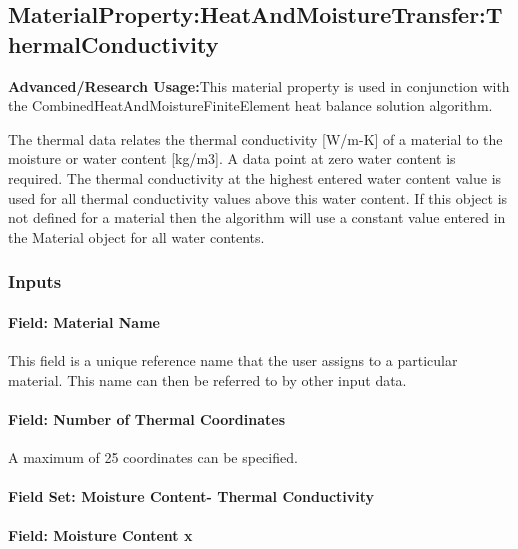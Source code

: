 \subsection{MaterialProperty:HeatAndMoistureTransfer:ThermalConductivity}\label{materialpropertyheatandmoisturetransferthermalconductivity}

\textbf{Advanced/Research Usage:}This material property is used in conjunction with the CombinedHeatAndMoistureFiniteElement heat balance solution algorithm.

The thermal data relates the thermal conductivity {[}W/m-K{]} of a material to the moisture or water content {[}kg/m3{]}. A data point at zero water content is required. The thermal conductivity at the highest entered water content value is used for all thermal conductivity values above this water content. If this object is not defined for a material then the algorithm will use a constant value entered in the Material object for all water contents.

\subsubsection{Inputs}\label{inputs-12-018}

\paragraph{Field: Material Name}\label{field-material-name-5}

This field is a unique reference name that the user assigns to a particular material. This name can then be referred to by other input data.

\paragraph{Field: Number of Thermal Coordinates}\label{field-number-of-thermal-coordinates}

A maximum of 25 coordinates can be specified.

\paragraph{Field Set: Moisture Content- Thermal Conductivity}\label{field-set-moisture-content--thermal-conductivity}

\paragraph{Field: Moisture Content x}\label{field-moisture-content-x-3}

